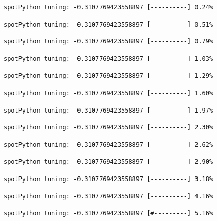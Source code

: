 \documentclass[
  letterpaper,
  DIV=11,
  numbers=noendperiod]{scrreprt}
\begin{document}
\begin{verbatim}
spotPython tuning: -0.3107769423558897 [----------] 0.24% 
\end{verbatim}

\begin{verbatim}
spotPython tuning: -0.3107769423558897 [----------] 0.51% 
\end{verbatim}

\begin{verbatim}
spotPython tuning: -0.3107769423558897 [----------] 0.79% 
\end{verbatim}

\begin{verbatim}
spotPython tuning: -0.3107769423558897 [----------] 1.03% 
\end{verbatim}

\begin{verbatim}
spotPython tuning: -0.3107769423558897 [----------] 1.29% 
\end{verbatim}

\begin{verbatim}
spotPython tuning: -0.3107769423558897 [----------] 1.60% 
\end{verbatim}

\begin{verbatim}
spotPython tuning: -0.3107769423558897 [----------] 1.97% 
\end{verbatim}

\begin{verbatim}
spotPython tuning: -0.3107769423558897 [----------] 2.30% 
\end{verbatim}

\begin{verbatim}
spotPython tuning: -0.3107769423558897 [----------] 2.62% 
\end{verbatim}

\begin{verbatim}
spotPython tuning: -0.3107769423558897 [----------] 2.90% 
\end{verbatim}

\begin{verbatim}
spotPython tuning: -0.3107769423558897 [----------] 3.18% 
\end{verbatim}

\begin{verbatim}
spotPython tuning: -0.3107769423558897 [----------] 4.16% 
\end{verbatim}

\begin{verbatim}
spotPython tuning: -0.3107769423558897 [#---------] 5.16% 
\end{verbatim}
\end{document}
